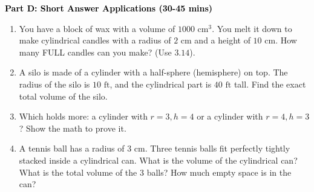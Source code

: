 \documentclass[12pt, letterpaper, fleqn]{article}
\begin{document}
\newpage

\begin{tcolorbox}[colback=customteal!20]
\large\textcolor{black}{\textbf{Part D: Short Answer Applications (30-45 mins)}}
\end{tcolorbox}

\vspace{3mm}

\begin{enumerate}[itemsep=4.2cm, leftmargin=0.6cm, resume]
\item You have a block of wax with a volume of $1000\text{ cm}^3$. You melt it down to make cylindrical candles with a radius of $2\text{ cm}$ and a height of $10\text{ cm}$. How many FULL candles can you make? (Use $3.14$).
\item A silo is made of a cylinder with a half-sphere (hemisphere) on top. The radius of the silo is $10\text{ ft}$, and the cylindrical part is $40\text{ ft}$ tall. Find the exact total volume of the silo.
\item Which holds more: a cylinder with $r=3, h=4$ or a cylinder with $r=4, h=3$? Show the math to prove it.
\item A tennis ball has a radius of $3\text{ cm}$. Three tennis balls fit perfectly tightly stacked inside a cylindrical can. What is the volume of the cylindrical can? What is the total volume of the 3 balls? How much empty space is in the can?
\end{enumerate}
\end{document}
